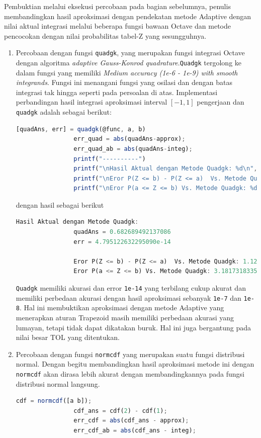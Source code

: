 \documentclass[journal,12pt,onecolumn,a4paper]{IEEEtran}
\begin{document}
Pembuktian melalui eksekusi percobaan pada bagian sebelumnya, penulis membandingkan hasil aproksimasi dengan pendekatan metode Adaptive dengan nilai aktual integrasi melalui beberapa fungsi bawaan Octave dan metode pencocokan dengan nilai probabilitas tabel-Z yang sesungguhnya.
\begin{enumerate}
	\item
	      Percobaan dengan fungsi \lstinline{quadgk}, yang merupakan fungsi integrasi Octave dengan algoritma \emph{adaptive Gauss-Konrod quadrature}.\lstinline{Quadgk} tergolong ke dalam fungsi yang memiliki \emph{Medium accuracy (1e-6 - 1e-9) with smooth integrands}. Fungsi ini menangani fungsi yang osilasi dan dengan batas integrasi tak hingga seperti pada persoalan di atas. Implementasi perbandingan hasil integrasi aproksimasi interval \([-1,1]\) pengerjaan dan \lstinline{quadgk} adalah sebagai berikut:

	      \begin{lstlisting}[language=Octave]
				[quadAns, err] = quadgk(@func, a, b)
				err_quad = abs(quadAns-approx);
				err_quad_ab = abs(quadAns-integ);
				printf("----------")
				printf("\nHasil Aktual dengan Metode Quadgk: %d\n", quadAns)
				printf("\nEror P(Z <= b) - P(Z <= a)  Vs. Metode Quadgk: %d\n", err_quad)
				printf("\nEror P(a <= Z <= b) Vs. Metode Quadgk: %d\n", err_quad_ab)
			\end{lstlisting}

	      dengan hasil sebagai berikut

	      \begin{lstlisting}[language=Octave]
				Hasil Aktual dengan Metode Quadgk: 
				quadAns = 0.682689492137086
				err = 4.795122632295090e-14  
		
				Eror P(Z <= b) - P(Z <= a)  Vs. Metode Quadgk: 1.123183701601249e-08
				Eror P(a <= Z <= b) Vs. Metode Quadgk: 3.181731833556967e-07
			\end{lstlisting}

	      \lstinline{Quadgk} memiliki akurasi dan error \lstinline{1e-14} yang terbilang cukup akurat dan memiliki perbedaan akurasi dengan hasil aproksimasi sebanyak \lstinline{1e-7} dan \lstinline{1e-8}. Hal ini membuktikan aproksimasi dengan metode Adaptive yang menerapkan aturan Trapezoid masih memiliki perbedaan akurasi yang lumayan, tetapi tidak dapat dikatakan buruk. Hal ini juga bergantung pada nilai besar TOL yang ditentukan.

	\item
	      Percobaan dengan fungsi \lstinline{normcdf} yang merupakan suatu fungsi distribusi normal. Dengan begitu membandingkan hasil aproksimasi metode ini dengan \lstinline{normcdf} akan dirasa lebih akurat dengan membandingkannya pada fungsi distribusi normal langsung.
	      \begin{lstlisting}[language=Octave]
				cdf = normcdf([a b]);
				cdf_ans = cdf(2) - cdf(1);
				err_cdf = abs(cdf_ans - approx);
				err_cdf_ab = abs(cdf_ans - integ);


\end{lstlisting}
\end{enumerate}
\end{document}
